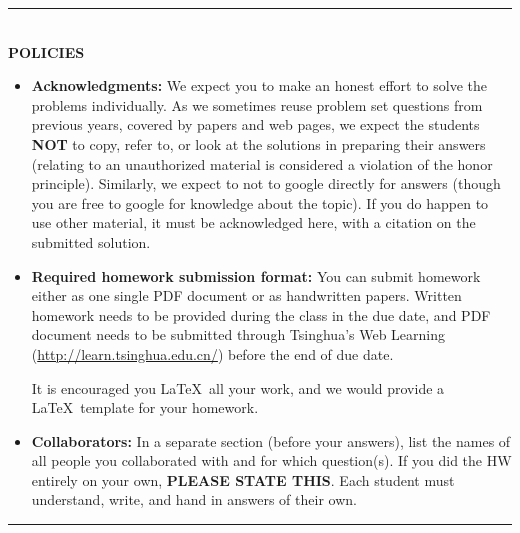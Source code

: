 \vspace{3em}

\rule{\textwidth}{1pt}
\\
\textbf{POLICIES}
\begin{itemize}
\item {\bf Acknowledgments: \/} 
  We expect you to make an honest effort to solve the problems individually.  As we sometimes reuse problem set questions from previous years, covered by papers and web pages, we expect the students \textbf{NOT} to copy, refer to, or look at the solutions in preparing their answers (relating to an unauthorized material is considered a violation of the honor principle). Similarly, we expect to not to google directly for answers (though you are free to google for knowledge about the topic). If you do happen to use other material, it must be acknowledged here, with a citation on the submitted solution.
  
\item {\bf Required homework submission format: \/} 
  You can submit homework either as one single PDF document or as handwritten papers. Written homework needs to be provided during the class in the due date, and PDF document needs to be submitted through Tsinghua's Web Learning (\url{http://learn.tsinghua.edu.cn/}) before the end of due date.
  
  It is encouraged you \LaTeX\ all your work, and we would provide a \LaTeX\ template for your homework.

\item {\bf Collaborators: \/}
In a separate section (before your answers), list the names of all people you collaborated with and for which question(s). If you did the HW entirely on your own, \textbf{PLEASE STATE THIS}. Each student must understand, write, and hand in answers of their own.
\end{itemize}
\rule{\textwidth}{1pt}
